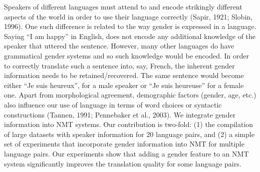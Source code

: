 Speakers of different languages must attend to and encode strikingly different aspects of the world in order to use their language correctly (Sapir, 1921; Slobin, 1996). One such difference is related to the way gender is expressed in a language. Saying ``I am happy'' in English, does not encode any additional knowledge of the speaker that uttered the sentence. However, many other languages do have grammatical gender systems and so such knowledge would be encoded. In order to correctly translate such a sentence into, say, French, the inherent gender information needs to be retained/recovered. The same sentence would become either ``Je suis heureux'', for a male speaker or ``Je suis heureuse'' for a female one. Apart from morphological agreement, demographic factors (gender, age, etc.) also influence our use of language in terms of word choices or syntactic constructions (Tannen,  1991;  Pennebaker et al., 2003). We integrate gender information into NMT systems. Our contribution is two-fold: (1) the compilation of large datasets with speaker information for 20 language pairs, and (2) a simple set of experiments that incorporate gender information into NMT for multiple language pairs. Our experiments show that adding a gender feature to an NMT system significantly improves the translation quality for some language pairs.
